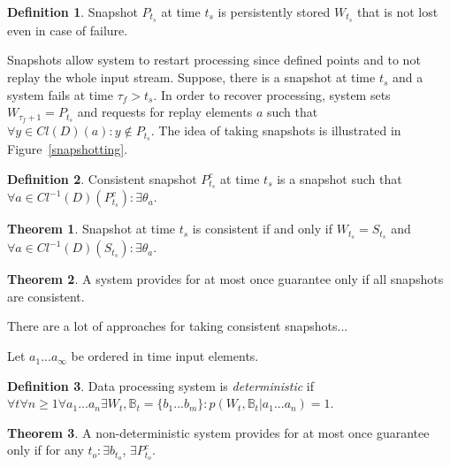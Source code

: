 \documentclass[sigconf]{acmart}
\theoremstyle{definition}
\newtheorem{definition}{Definition}
\newtheorem{theorem}{Theorem}
\begin{document}
\begin{definition}{Snapshot}
$P_{t_s}$ at time $t_s$ is persistently stored $W_{t_s}$ that is not lost even in case of failure.
\end{definition}

Snapshots allow system to restart processing since defined points and to not replay the whole input stream. Suppose, there is a snapshot at time $t_s$ and a system fails at time $\tau_f>t_s$. In order to recover processing, system sets $W_{\tau_f+1}=P_{t_s}$ and requests for replay elements $a$ such that $\forall{y\in{Cl(D)(a)}}:y\notin{P_{t_s}}$. The idea of taking snapshots is illustrated in Figure~\ref{snapshotting}.

\begin{definition}{Consistent snapshot}
$P^{c}_{t_s}$ at time $t_s$ is a snapshot such that $\forall{a}\in{Cl^{-1}(D)(P^{c}_{t_s})}:\exists{\theta_a}$.
\end{definition}

\begin{theorem}
Snapshot at time $t_s$ is consistent if and only if $W_{t_s}=S_{t_s}$ and $\forall{a}\in{Cl^{-1}(D)(S_{t_s})}:\exists{\theta_a}$. 
\end{theorem}

\begin{theorem}
A system provides for at most once guarantee only if all snapshots are consistent.  
\end{theorem}

There are a lot of approaches for taking consistent snapshots...

Let $a_1...a_\infty$ be ordered in time input elements.

\begin{definition}{Data processing system is {\em deterministic}}
if \\
$\forall{t} \forall{n\geq1} \forall{a_1...a_n}\exists{W_t,\mathbb{B}_t={\{b_1...b_m\}}}:p(W_t,\mathbb{B}_t|a_1...a_n)=1$.
\end{definition}

\begin{theorem}
A non-deterministic system provides for at most once guarantee only if for any ${t_o}:\exists{b_{t_o}}$, $\exists{P^{c}_{t_o}}$.  
\end{theorem}


\end{document}

